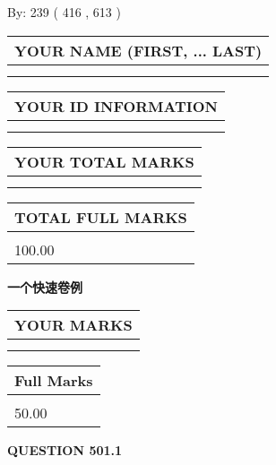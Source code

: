 \documentclass{ctexart}
\begin{document}
   
\hspace{1.0in} By: 
 239 ( 416 ,  613 )
   
   
   
   
\newpage 
\setcounter{page}{ 
   501001 } 
   
   
   
   
\noindent\begin{tabular}{|l|}
\hline
YOUR NAME (FIRST, ... LAST)  \\
\hline
 \\ 
 \\ 
\hline
\end{tabular}
\hspace{0.05in} \begin{tabular}{|l|}
\hline
 YOUR   ID   INFORMATION  \\
\hline
 \\ 
 \\ 
\hline
\end{tabular}
   
   
\vspace{0.2in}\noindent\begin{tabular}{|l|}
\hline
YOUR TOTAL MARKS  \\
\hline
 \\ 
 \\ 
\hline
\end{tabular}
\hspace{0.05in} \begin{tabular}{|l|}
\hline
TOTAL FULL MARKS  \\
\hline
 \\ 
100.00 \\
\hline
\end{tabular}
   
   
 \vspace{0.2in}
{\LARGE {\textbf{ 一个快速卷例}}}
   
   
  
\vspace{0.2in}
  
\noindent\begin{tabular}{|l|}
\hline
 YOUR MARKS  \\
\hline
 \\ 
 \\ 
\hline
\end{tabular}
\hspace{0.05in} \begin{tabular}{|l|}
\hline
 Full Marks  \\
\hline
 \\ 
50.00 \\
\hline
\end{tabular}
{\textbf{\Large{QUESTION
501.1 
}}}
  
\end{document}
